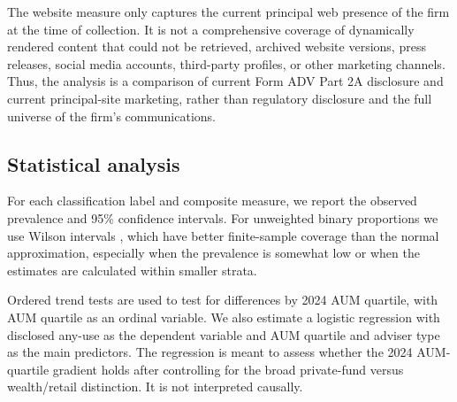 \documentclass[utf8]{FrontiersinHarvard}
\begin{document}
The website measure only captures the current principal web presence of the firm at the time of collection. It is not a comprehensive coverage of dynamically rendered content that could not be retrieved, archived website versions, press releases, social media accounts, third-party profiles, or other marketing channels. Thus, the analysis is a comparison of current Form ADV Part 2A disclosure and current principal-site marketing, rather than regulatory disclosure and the full universe of the firm's communications.

\subsection{Statistical analysis}

For each classification label and composite measure, we report the observed prevalence and 95\% confidence intervals. For unweighted binary proportions we use Wilson intervals \citep{wilson1927}, which have better finite-sample coverage than the normal approximation, especially when the prevalence is somewhat low or when the estimates are calculated within smaller strata.

Ordered trend tests are used to test for differences by 2024 AUM
quartile, with AUM quartile as an ordinal variable. We also estimate a logistic regression with disclosed any-use as the dependent variable and AUM quartile and adviser type as the main predictors. The regression is meant to assess whether the 2024 AUM-quartile gradient holds after controlling for the broad private-fund versus wealth/retail distinction. It is not interpreted causally.
\end{document}
